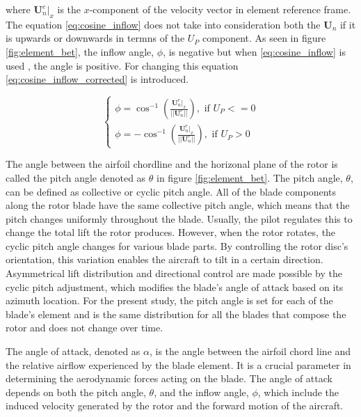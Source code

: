where $\mathbf{U}_n^e|_x$ is the $x$-component of the velocity vector in element reference frame. The equation \ref{eq:cosine_inflow} does not take into consideration both the $\mathbf{U}_n$ if it is upwards or downwards in termns of the $U_P$ component. As seen in figure \ref{fig:element_bet}, the inflow angle, $\phi$, is negative but when \ref{eq:cosine_inflow} is used , the angle is positive. For changing this equation \ref{eq:cosine_inflow_corrected} is introduced.

\begin{equation}
    \begin{cases}
        \phi = \cos^{-1} \left( \frac{\mathbf{U}_n^e|_x}{||\mathbf{U}_n^e||}\right), \text{ if } U_P <= 0\\
        \phi = - \cos^{-1} \left( \frac{\mathbf{U}_n^e|_x}{||\mathbf{U}_n^e||}\right), \text{ if } U_P > 0
    \end{cases}
    \label{eq:cosine_inflow_corrected}
\end{equation}

The angle between the airfoil chordline and the horizonal plane of the rotor is called the pitch angle denoted as $\theta$ in figure \ref{fig:element_bet}. The pitch angle, $\theta$, can be defined as collective or cyclic pitch angle. All of the blade components along the rotor blade have the same collective pitch angle, which means that the pitch changes uniformly throughout the blade. Usually, the pilot regulates this to change the total lift the rotor produces. However, when the rotor rotates, the cyclic pitch angle changes for various blade parts. By controlling the rotor disc's orientation, this variation enables the aircraft to tilt in a certain direction. Asymmetrical lift distribution and directional control are made possible by the cyclic pitch adjustment, which modifies the blade's angle of attack based on its azimuth location. For the present study, the pitch angle is set for each of the blade's element and is the same distribution for all the blades that compose the rotor and does not change over time. 

The angle of attack, denoted as $\alpha$, is the angle between the airfoil chord line and the relative airflow experienced by the blade element. It is a crucial parameter in determining the aerodynamic forces acting on the blade. The angle of attack depends on both the pitch angle,  $\theta$, and the inflow angle, $\phi$, which include the induced velocity generated by the rotor and the forward motion of the aircraft. 

